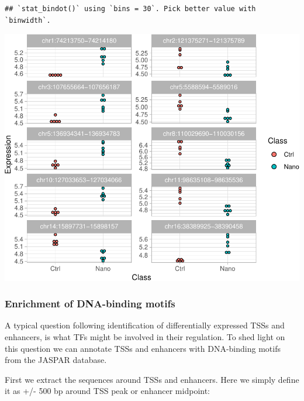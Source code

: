 \documentclass[9pt,a4paper,]{extarticle}
\newenvironment{Shaded}{\begin{snugshade}}{\end{snugshade}}
\newcommand{\KeywordTok}[1]{\textcolor[rgb]{0.13,0.29,0.53}{\textbf{{#1}}}}
\newcommand{\DecValTok}[1]{\textcolor[rgb]{0.00,0.00,0.81}{{#1}}}
\newcommand{\StringTok}[1]{\textcolor[rgb]{0.31,0.60,0.02}{{#1}}}
\newcommand{\NormalTok}[1]{{#1}}
\begin{document}
\begin{verbatim}
## `stat_bindot()` using `bins = 30`. Pick better value with `binwidth`.
\end{verbatim}

\begin{center}\includegraphics{CAGEWorkflow_files/figure-latex/ploTop10-1} \end{center}

\subsubsection{Enrichment of DNA-binding motifs}\label{enrichment-of-dna-binding-motifs}

A typical question following identification of differentially expressed TSSs and enhancers, is what TFs might be involved in their regulation. To shed light on this question we can annotate TSSs and enhancers with DNA-binding motifs from the JASPAR database\citep{Mathelier2016}.

First we extract the sequences around TSSs and enhancers. Here we simply define it as +/- 500 bp around TSS peak or enhancer midpoint:

\begin{Shaded}
\end{Shaded}
\end{document}
